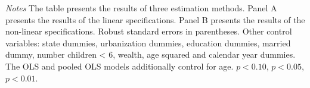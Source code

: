 \begin{table}[p]
\begin{center}
\begin{adjustbox}{max width=\linewidth}
\begin{threeparttable}
{\begin{tabular}{l*{6}{S
S}}
\bottomrule
\end{tabular}
\begin{tablenotes}
\item \footnotesize \textit{Notes} The table presents the results of three estimation methods. Panel A presents the results of the linear specifications. Panel B presents the results of the non-linear specifications. Robust standard errors in parentheses. Other control variables: state dummies, urbanization dummies, education dummies, married dummy, number children < 6, wealth, age squared and calendar year dummies. The OLS and pooled OLS models additionally control for age. \sym{*} \(p<0.10\), \sym{**} \(p<0.05\), \sym{***} \(p<0.01\).
\end{tablenotes}
}
\end{threeparttable}
\end{adjustbox}
\end{center}
\end{table}


